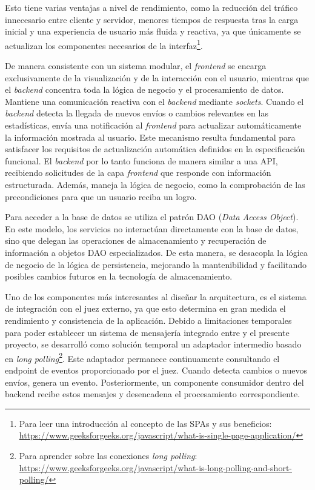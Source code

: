 Esto tiene varias ventajas a nivel de rendimiento, como la reducción del tráfico innecesario entre cliente y servidor, menores tiempos de respuesta tras la carga inicial y una experiencia de usuario más fluida y reactiva, ya que únicamente se actualizan los componentes necesarios de la interfaz\footnote{Para leer una introducción al concepto de las SPAs y sus beneficios: \url{https://www.geeksforgeeks.org/javascript/what-is-single-page-application/}}.


De manera consistente con un sistema modular, el \textit{frontend} se encarga exclusivamente de la visualización y de la interacción con el usuario, mientras que el \textit{backend} concentra toda la lógica de negocio y el procesamiento de datos. Mantiene una comunicación reactiva con el \textit{backend} mediante \textit{sockets}. Cuando el \textit{backend} detecta la llegada de nuevos envíos o cambios relevantes en las estadísticas, envía una notificación al \textit{frontend} para actualizar automáticamente la información mostrada al usuario. Este mecanismo resulta fundamental para satisfacer los requisitos de actualización automática definidos en la especificación funcional.
El \textit{backend} por lo tanto funciona de manera similar a una API, recibiendo solicitudes de la capa \textit{frontend} que responde con información estructurada. Además, maneja la lógica de negocio, como la comprobación de las precondiciones para que un usuario reciba un logro.

Para acceder a la base de datos se utiliza el patrón DAO (\textit{Data Access Object}). En este modelo, los servicios no interactúan directamente con la base de datos, sino que delegan las operaciones de almacenamiento y recuperación de información a objetos DAO especializados. De esta manera, se desacopla la lógica de negocio de la lógica de persistencia, mejorando la mantenibilidad y facilitando posibles cambios futuros en la tecnología de almacenamiento.

Uno de los componentes más interesantes al diseñar la arquitectura, es el sistema de integración con el juez externo, ya que esto determina en gran medida el rendimiento y consistencia de la aplicación. Debido a limitaciones temporales para poder establecer un sistema de mensajería integrado entre \aer y el presente proyecto, se desarrolló como solución temporal un adaptador intermedio basado en \textit{long polling}\footnote{Para aprender sobre las conexiones \textit{long polling}: \url{https://www.geeksforgeeks.org/javascript/what-is-long-polling-and-short-polling/}}. Este adaptador permanece continuamente consultando el endpoint de eventos proporcionado por el juez. Cuando detecta cambios o nuevos envíos, genera un evento. Posteriormente, un componente consumidor dentro del backend recibe estos mensajes y desencadena el procesamiento correspondiente.

